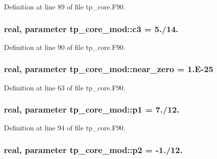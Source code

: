 Definition at line 89 of file tp\-\_\-core.\-F90.

\subsubsection[{c3}]{\setlength{\rightskip}{0pt plus 5cm}real, parameter tp\-\_\-core\-\_\-mod\-::c3 = 5./14.\hspace{0.3cm}{\ttfamily [private]}}\label{classtp__core__mod_a4c4814e6fd884b9c244aa403c391d56a}


Definition at line 90 of file tp\-\_\-core.\-F90.

\subsubsection[{near\-\_\-zero}]{\setlength{\rightskip}{0pt plus 5cm}real, parameter tp\-\_\-core\-\_\-mod\-::near\-\_\-zero = 1.E-\/25\hspace{0.3cm}{\ttfamily [private]}}\label{classtp__core__mod_ad41545dca954897d2750ebd81663ba71}


Definition at line 63 of file tp\-\_\-core.\-F90.

\subsubsection[{p1}]{\setlength{\rightskip}{0pt plus 5cm}real, parameter tp\-\_\-core\-\_\-mod\-::p1 = 7./12.\hspace{0.3cm}{\ttfamily [private]}}\label{classtp__core__mod_aa0a4ae3e2a26b88120205e9f7080910e}


Definition at line 94 of file tp\-\_\-core.\-F90.

\subsubsection[{p2}]{\setlength{\rightskip}{0pt plus 5cm}real, parameter tp\-\_\-core\-\_\-mod\-::p2 = -\/1./12.\hspace{0.3cm}{\ttfamily [private]}}\label{classtp__core__mod_a110229a82e4ca9f5a8a56f464291b7b4}


